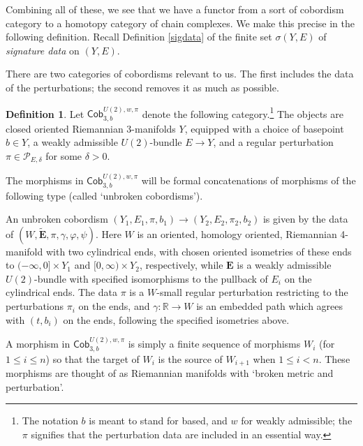 \documentclass[10pt,a4paper]{amsart}
\theoremstyle{definition}
\newtheorem{definition}[theorem]{Definition}
\theoremstyle{remark}
\numberwithin{figure}{qchap}
\begin{document}
Combining all of these, we see that we have a functor from a sort of cobordism category to a homotopy category of chain complexes. We make this precise in the following definition. Recall Definition \ref{sigdata} of the finite set $\sigma(Y,E)$ of \textit{signature data} on $(Y, E)$.

There are two categories of cobordisms relevant to us. The first includes the data of the perturbations; the second removes it as much as possible.

\begin{definition}\label{cobcat}
Let $\mathsf{Cob}_{3,b}^{U(2),w,\pi}$ denote the following category.\footnote{The notation $b$ is meant to stand for based, and $w$ for weakly admissible; the $\pi$ signifies that the perturbation data are included in an essential way.} The objects are closed oriented Riemannian 3-manifolds $Y$, equipped with a choice of basepoint $b \in Y$, a weakly admissible $U(2)$-bundle $E \to Y$, and a regular perturbation $\pi \in \mathcal P_{E, \delta}$ for some $\delta > 0$. 

The morphisms in $\mathsf{Cob}_{3,b}^{U(2),w,\pi}$ will be formal concatenations of morphisms of the following type (called `unbroken cobordisms').

An unbroken cobordism $(Y_1, E_1, \pi, b_1) \to (Y_2, E_2, \pi_2, b_2)$ is given by the data of $(W, \widetilde{\mathbf{E}}, \pi,\gamma, \varphi,\psi)$. Here $W$ is an oriented, homology oriented, Riemannian 4-manifold with two cylindrical ends, with chosen oriented isometries of these ends to $(-\infty, 0] \times Y_1$ and $[0,\infty) \times Y_2$, respectively, while $\mathbf{E}$ is a weakly admissible $U(2)$-bundle with specified isomorphisms to the pullback of $E_i$ on the cylindrical ends. The data $\pi$ is a $W$-small regular perturbation restricting to the perturbations $\pi_i$ on the ends, and $\gamma: \mathbb R \to W$ is an embedded path which agrees with $(t, b_i)$ on the ends, following the specified isometries above.

A morphism in $\mathsf{Cob}_{3,b}^{U(2),w,\pi}$ is simply a finite sequence of morphisms $W_i$ (for $1 \leq i \leq n$) so that the target of $W_i$ is the source of $W_{i+1}$ when $1 \leq i < n$. These morphisms are thought of as Riemannian manifolds with `broken metric and perturbation'.


\end{definition}
\end{document}
